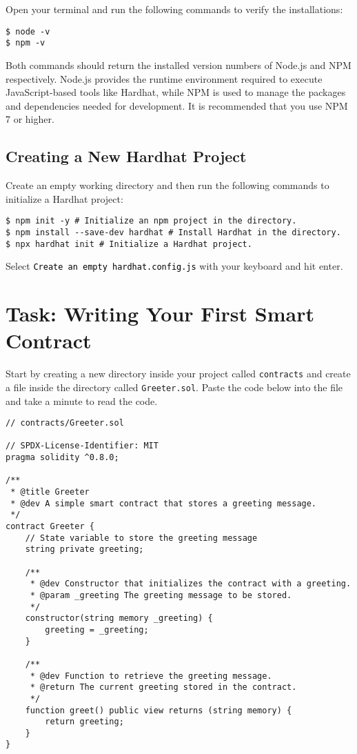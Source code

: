 \documentclass[12pt]{article}
\newcommand{\codegrey}[1]{%
  \texttt{\colorbox{black!4}{\textcolor{black}{#1}}}%
}
\begin{document}
Open your terminal and run the following commands to verify the installations:

\begin{verbatim}
$ node -v
$ npm -v
\end{verbatim}

Both commands should return the installed version numbers of Node.js and NPM respectively. Node.js provides the runtime environment required to execute JavaScript-based tools like Hardhat, while NPM is used to manage the packages and dependencies needed for development. It is recommended that you use NPM 7 or higher.

\subsection{Creating a New Hardhat Project}

Create an empty working directory and then run the following commands to initialize a Hardhat project:

\begin{verbatim}
$ npm init -y # Initialize an npm project in the directory.
$ npm install --save-dev hardhat # Install Hardhat in the directory.
$ npx hardhat init # Initialize a Hardhat project.
\end{verbatim}
Select \codegrey{Create an empty \texttt{hardhat.config.js}} with your keyboard and hit enter.

\section{Task: Writing Your First Smart Contract}

Start by creating a new directory inside your project called \texttt{contracts} and create a file inside the directory called \texttt{Greeter.sol}. Paste the code below into the file and take a minute to read the code.

\begin{verbatim}
// contracts/Greeter.sol

// SPDX-License-Identifier: MIT
pragma solidity ^0.8.0;

/**
 * @title Greeter
 * @dev A simple smart contract that stores a greeting message.
 */
contract Greeter {
    // State variable to store the greeting message
    string private greeting;

    /**
     * @dev Constructor that initializes the contract with a greeting.
     * @param _greeting The greeting message to be stored.
     */
    constructor(string memory _greeting) {
        greeting = _greeting;
    }

    /**
     * @dev Function to retrieve the greeting message.
     * @return The current greeting stored in the contract.
     */
    function greet() public view returns (string memory) {
        return greeting;
    }
}
\end{verbatim}
\end{document}
